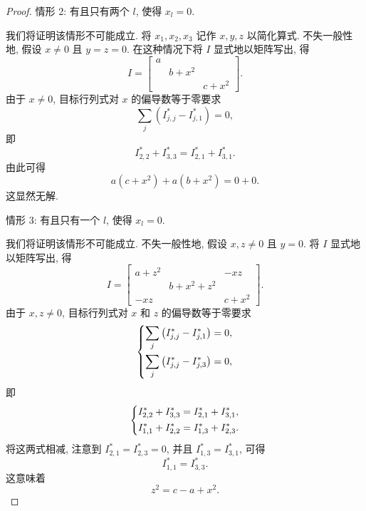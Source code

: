 \documentclass{article}
\begin{document}
\begin{proof}
情形 2: 有且只有两个 $l$, 使得 $x_l=0$.

我们将证明该情形不可能成立.
将 $x_1,x_2,x_3$ 记作 $x,y,z$ 以简化算式.
不失一般性地, 假设 $x\ne0$ 且 $y=z=0$.
在这种情况下将 $I$ 显式地以矩阵写出, 得
\begin{equation}
	I=\left[\begin{matrix}a\\&b+x^2\\&&c+x^2\end{matrix}\right].
\end{equation}
由于 $x\ne0$, 目标行列式对 $x$ 的偏导数等于零要求
\begin{equation}
	\sum_j\left(I^*_{j,j}-I^*_{j,1}\right)=0,
\end{equation}
即
\begin{equation}
	I^*_{2,2}+I^*_{3,3}=I^*_{2,1}+I^*_{3,1}.
\end{equation}
由此可得
\begin{equation}
	a\left(c+x^2\right)+a\left(b+x^2\right)=0+0.
\end{equation}
这显然无解.

情形 3: 有且只有一个 $l$, 使得 $x_l=0$.

我们将证明该情形不可能成立.
不失一般性地, 假设 $x,z\ne0$ 且 $y=0$.
将 $I$ 显式地以矩阵写出, 得
\begin{equation}
	I=\left[\begin{matrix}a+z^2&&-xz\\&b+x^2+z^2\\-xz&&c+x^2\end{matrix}\right].
\end{equation}
由于 $x,z\ne0$, 目标行列式对 $x$ 和 $z$ 的偏导数等于零要求
\begin{equation}
	\begin{dcases}
		\sum_j\left(I^*_{j,j}-I^*_{j,1}\right)=0,\\
		\sum_j\left(I^*_{j,j}-I^*_{j,3}\right)=0,
	\end{dcases}
\end{equation}
即
\begin{equation}
	\label{eq:情形2方程组}
	\begin{dcases}
		I^*_{2,2}+I^*_{3,3}=I^*_{2,1}+I^*_{3,1},\\
		I^*_{1,1}+I^*_{2,2}=I^*_{1,3}+I^*_{2,3}.
	\end{dcases}
\end{equation}
将这两式相减, 注意到 $I^*_{2,1}=I^*_{2,3}=0$, 并且 $I^*_{1,3}=I^*_{3,1}$,
可得
\begin{equation}
	I^*_{1,1}=I^*_{3,3}.
\end{equation}
这意味着
\begin{equation}
	\label{eq:z用x表示}
	z^2=c-a+x^2.
\end{equation}


\end{proof}
\end{document}
